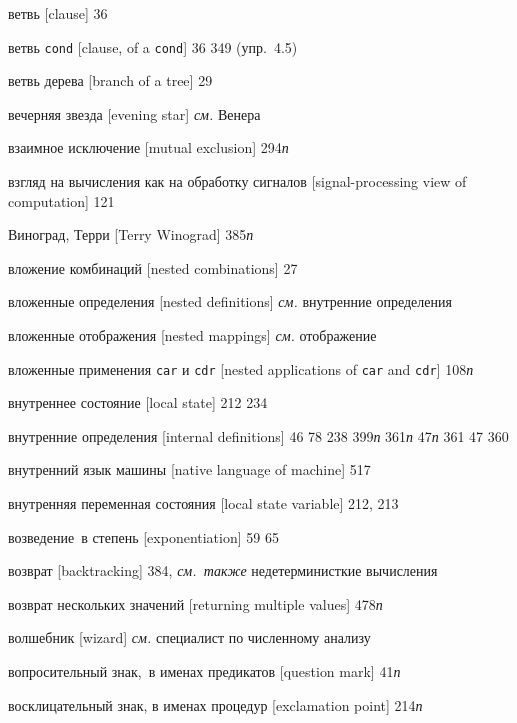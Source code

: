 \begin{theindex}
\item {ветвь [clause]} 36
\item {ветвь {\tt cond} [clause, of a {\tt cond}]} 36
   349 (упр.~4.5)
\item {ветвь дерева [branch of a tree]} 29
\item {вечерняя звезда [evening star]} {\it см.} Венера
\item {взаимное исключение [mutual exclusion]} 294{\it п}
\item {взгляд на вычисления как на обработку сигналов [signal-processing view of computation]} 121
\item {Виноград, Терри [Terry Winograd]} 385{\it п}
\item {вложение комбинаций [nested combinations]} 27
\item {вложенные определения [nested definitions]} {\it см.} внутренние определения
\item {вложенные отображения [nested mappings]} {\it см.} отображение
\item {вложенные применения \texttt{car} и \texttt{cdr} [nested applications of {\tt car} and {\tt cdr}]} 108{\it п}
\item {внутреннее состояние [local state]} 212
   234
\item {внутренние определения [internal definitions]} 46
   78
   238
   399{\it п}
   361{\it п}
   47{\it п}
   361
   47
   360
\item {внутренний язык машины [native language of machine]} 517
\item {внутренняя переменная состояния [local state variable]} 212, 213
\item {возведение~в степень [exponentiation]} 59
   65
\item {возврат [backtracking]} 384, {\it см.~также} недетерминисткие вычисления
\item {возврат нескольких значений [returning multiple values]} 478{\it п}
\item {волшебник [wizard]} {\it см.} специалист по численному анализу
\item {вопросительный знак,~в именах предикатов [question mark]} 41{\it п}
\item {восклицательный знак, в именах процедур [exclamation point]} 214{\it п}

\end{theindex}
